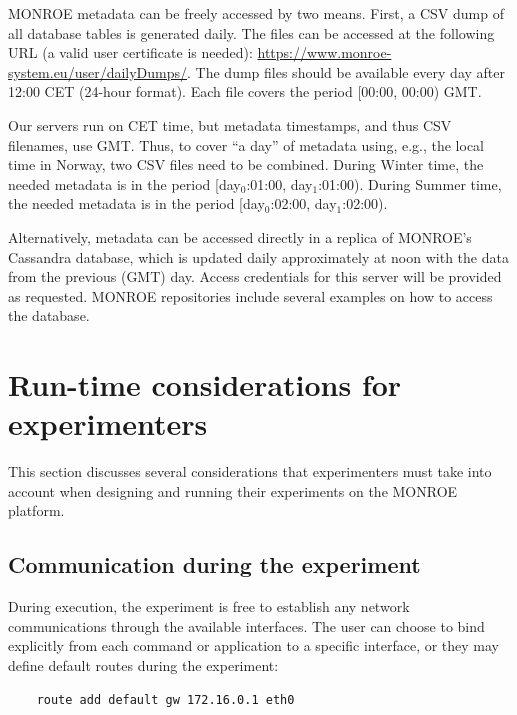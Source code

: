 \documentclass[a4paper,10pt]{article}
\newcommand{\VerbatimFont}{\footnotesize}
\newcommand{\monroe}{MONROE}
\begin{document}
\monroe{} metadata can be freely accessed by two means.
First, a CSV dump of all database tables is generated daily.
The files can be accessed at the following URL (a valid user certificate is needed): \url{https://www.monroe-system.eu/user/dailyDumps/}.
The dump files should be available every day after 12:00 CET (24-hour format).
Each file covers the period [00:00, 00:00) GMT.

Our servers run on CET time, but metadata timestamps, and thus CSV filenames, use GMT. Thus, to cover ``a day'' of metadata using, e.g., the local time in Norway, two CSV files need to be combined.
During Winter time, the needed metadata is in the period [day$_0$:01:00, day$_1$:01:00).
During Summer time, the needed metadata is in the period [day$_0$:02:00, day$_1$:02:00).

Alternatively, metadata can be accessed directly in a replica of \monroe{}'s Cassandra database, which is updated daily approximately at noon with the data from the previous (GMT) day.
Access credentials for this server will be provided as requested.
\monroe{} repositories include several examples on how to access the database.



\section{Run-time considerations for experimenters}
\label{sec:experimentRuntime}

This section discusses several considerations that experimenters must take into account when designing and running their experiments on the \monroe{} platform.

\subsection{Communication during the experiment}
\label{subsec:communicationDuringExperiment}

During execution, the experiment is free to establish any network communications through the available interfaces.
The user can choose to bind explicitly from each command or application to a specific interface, or they may define default routes during the experiment:
{\VerbatimFont\begin{verbatim}
	route add default gw 172.16.0.1 eth0
\end{verbatim}}
\end{document}

